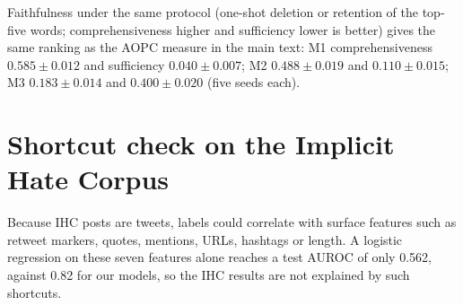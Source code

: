 \documentclass[preprint,12pt,authoryear]{elsarticle}
\begin{document}
Faithfulness under the same protocol (one-shot deletion or retention of the top-five words; comprehensiveness higher and sufficiency lower is better) gives the same ranking as the AOPC measure in the main text: M1 comprehensiveness $0.585\pm0.012$ and sufficiency $0.040\pm0.007$; M2 $0.488\pm0.019$ and $0.110\pm0.015$; M3 $0.183\pm0.014$ and $0.400\pm0.020$ (five seeds each).

\section{Shortcut check on the Implicit Hate Corpus}
\label{app:ihc}
Because IHC posts are tweets, labels could correlate with surface features such as retweet markers, quotes, mentions, URLs, hashtags or length. A logistic regression on these seven features alone reaches a test AUROC of only 0.562, against 0.82 for our models, so the IHC results are not explained by such shortcuts.



\end{document}
